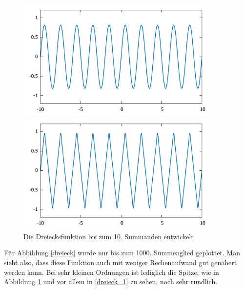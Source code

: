                 \begin{figure}[htbp]
                  \begin{minipage}{0.45\textwidth}
                   \centering
                    \includegraphics[width=0.9\textwidth]{Abb/dreieck_1}
                    \caption{Die Dreiecksfunktion bis zum 1. Summanden entwickelt}
                    \label{dreieck_1}
                  \end{minipage}\hfill
                  \begin{minipage}{0.45\textwidth}
                   \centering
                    \includegraphics[width=0.9\textwidth]{Abb/dreieck_10.pdf}
                    \caption{Die Dreiecksfunktion bis zum 10. Summanden entwickelt}
                    \label{dreieck_10}
                  \end{minipage}
                \end{figure}
Für Abbildung \ref{dreieck} wurde nur bis zum 1000. Summenglied geplottet. Man sieht
also, dass diese Funktion auch mit weniger Rechenaufwand gut genähert werden kann.
Bei sehr kleinen Ordnungen ist lediglich die Spitze, wie in Abbildung \ref{dreieck_10}
und vor allem in \ref{dreieck_1} zu sehen, noch sehr rundlich.

